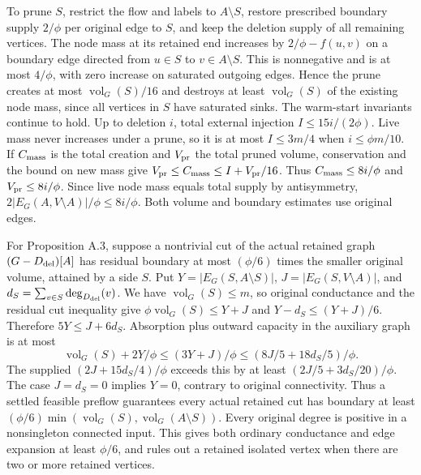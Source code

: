 \documentclass[11pt]{article}
\begin{document}
\begin{itemize}
  To prune \(S\), restrict the flow and labels to \(A\setminus S\), restore prescribed boundary supply \(2/\phi\) per original edge to \(S\), and keep the deletion supply of all remaining vertices. The node mass at its retained end increases by \(2/\phi-f(u,v)\) on a boundary edge directed from \(u\in S\) to \(v\in A\setminus S\). This is nonnegative and is at most \(4/\phi\), with zero increase on saturated outgoing edges. Hence the prune creates at most \(\operatorname{vol}_G(S)/16\) and destroys at least \(\operatorname{vol}_G(S)\) of the existing node mass, since all vertices in \(S\) have saturated sinks. The warm-start invariants continue to hold. Up to deletion \(i\), total external injection \(I\le15i/(2\phi)\). Live mass never increases under a prune, so it is at most \(I\le3m/4\) when \(i\le\phi m/10\). If \(C_{\rm mass}\) is the total creation and \(V_{\rm pr}\) the total pruned volume, conservation and the bound on new mass give \(V_{\rm pr}\le C_{\rm mass}\le I+V_{\rm pr}/16\). Thus \(C_{\rm mass}\le 8i/\phi\) and \(V_{\rm pr}\le 8i/\phi\). Since live node mass equals total supply by antisymmetry, \(2|E_G(A,V\setminus A)|/\phi\le 8i/\phi\). Both volume and boundary estimates use original edges.

  For Proposition A.3, suppose a nontrivial cut of the actual retained graph \((G-D_{\rm del})[A]\) has residual boundary at most \((\phi/6)\) times the smaller original volume, attained by a side \(S\). Put \(Y=|E_G(S,A\setminus S)|\), \(J=|E_G(S,V\setminus A)|\), and \(d_S=\sum_{v\in S}\deg_{D_{\rm del}}(v)\). We have \(\operatorname{vol}_G(S)\le m\), so original conductance and the residual cut inequality give \(\phi\operatorname{vol}_G(S)\le Y+J\) and \(Y-d_S\le(Y+J)/6\). Therefore \(5Y\le J+6d_S\). Absorption plus outward capacity in the auxiliary graph is at most
  \[
  \operatorname{vol}_G(S)+2Y/\phi
     \le (3Y+J)/\phi\le(8J/5+18d_S/5)/\phi .
  \]
  The supplied \((2J+15d_S/4)/\phi\) exceeds this by at least \((2J/5+3d_S/20)/\phi\). The case \(J=d_S=0\) implies \(Y=0\), contrary to original connectivity. Thus a settled feasible preflow guarantees every actual retained cut has boundary at least \((\phi/6)\min(\operatorname{vol}_G(S),\operatorname{vol}_G(A\setminus S))\). Every original degree is positive in a nonsingleton connected input. This gives both ordinary conductance and edge expansion at least \(\phi/6\), and rules out a retained isolated vertex when there are two or more retained vertices.


\end{itemize}
\end{document}

